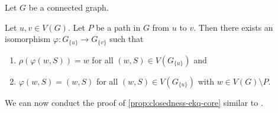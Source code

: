 \documentclass{lmcs}
\theoremstyle{plain}\newtheorem{claim}[thm]{Claim}   %
\renewcommand\phi\varphi
\begin{document}
\begin{lem}
	\label{lem:neuen4.3}
	Let $G$ be a connected graph.
	
	Let $u, v\in V(G)$.
	Let $P$ be a path in $G$ from $u$ to $v$.
	Then there exists an isomorphism $\phi \colon G_{\{ u \}} \to G_{\{v\}}$ such that 
	\begin{enumerate}
		\item $\rho(\phi(w, S)) = w$ for all $(w, S) \in V(G_{\{u\}})$ and
		\item $\phi(w, S) = (w, S)$ for all $(w, S) \in V(G_{\{u\}})$ with $w \in V(G) \setminus P$.
	\end{enumerate}
\end{lem}

We can now conduct the proof of \autoref{prop:closedness-ekq-core} similar to \cite{Furer_rounds_2001}.
\end{document}
